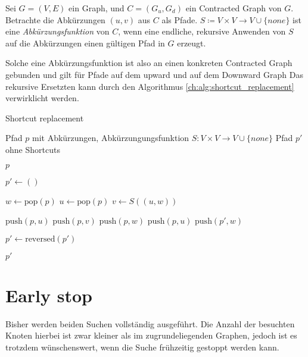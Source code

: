\begin{definition}[Abkürzungsfunktion]
    Sei $G = (V, E)$ ein Graph, und $C = (G_u, G_d)$ ein Contracted Graph von $G$.
    Betrachte die Abkürzungen $(u, v)$ aus $C$ als Pfade.
    $S \coloneq V \times V \to V \cup \{ {none} \}$ ist eine \emph{Abkürzungsfunktion} von $C$, wenn eine endliche, rekursive Anwenden von $S$ auf die Abkürzungen einen gültigen Pfad in $G$ erzeugt.
\end{definition}

Solche eine Abkürzungsfunktion ist also an einen konkreten Contracted Graph gebunden und gilt für Pfade auf dem upward und auf dem Downward Graph 
Das rekursive Ersetzten kann durch den Algorithmus \ref{ch:alg:shortcut_replacement} verwirklicht werden.

\begin{algorithm}[ht]
    \caption{Shortcut replacement}
    \begin{algorithmic}[1]
        \Require Pfad $p$ mit Abkürzungen, Abkürzungungsfunktion $S \colon V \times V \to V \cup \{ {none} \}$
        \Ensure Pfad $p'$ ohne Shortcuts

        \State \Return $p$
        \EndIf
        \State

        \State $p' \leftarrow ()$
        \State

        \State $w \leftarrow \text{pop}(p)$
        \State $u \leftarrow \text{pop}(p)$
        \State $v \leftarrow S((u, w))$
        \State

        \State $\text{push}(p, u)$
        \State $\text{push}(p, v)$
        \State $\text{push}(p, w)$
        \Else
        \State $\text{push}(p, u)$
        \State $\text{push}(p', w)$
        \EndIf
        \EndWhile

        \State
        \State $p' \leftarrow \text{reversed}(p')$

        \State
        \State \Return $p'$
    \end{algorithmic}
    \label{ch:alg:shortcut_replacement}
\end{algorithm}

\section{Early stop}

Bisher werden beiden Suchen vollständig ausgeführt.
Die Anzahl der besuchten Knoten hierbei ist zwar kleiner als im zugrundeliegenden Graphen, jedoch ist es trotzdem wünschenswert, wenn die Suche frühzeitig gestoppt werden kann.

